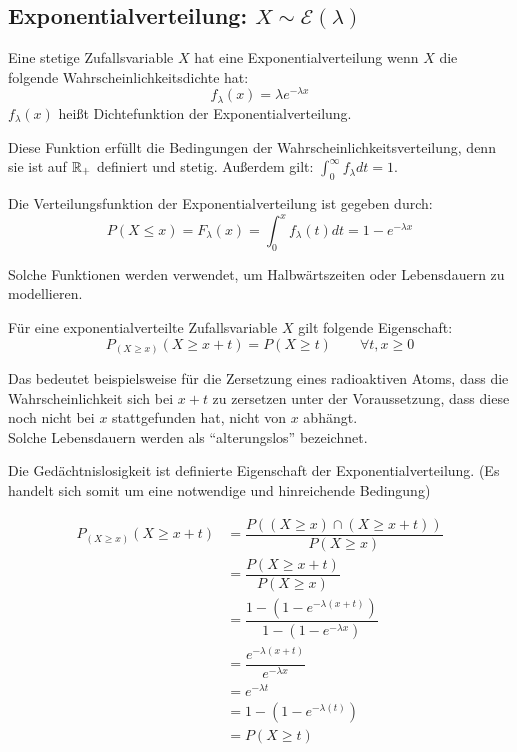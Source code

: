 \documentclass[main.tex]{subfiles}
\begin{document}
\subsection{Exponentialverteilung: $X \sim \mathcal{E}(\lambda)$}
\begin{Definition}
  Eine stetige Zufallsvariable $X$ hat eine Exponentialverteilung wenn $X$ die folgende Wahrscheinlichkeitsdichte hat:
  $$f_\lambda (x) = \lambda e^{-\lambda x}$$
  $f_\lambda(x)$ heißt Dichtefunktion der Exponentialverteilung.
\end{Definition}
\begin{Bemerkung}
  Diese Funktion erfüllt die Bedingungen der Wahrscheinlichkeitsverteilung, denn sie ist auf $\mathbb{R}_{+}$ definiert und stetig. Außerdem gilt: $\displaystyle \int_0^\infty f_\lambda dt = 1$.
\end{Bemerkung}
\begin{Definition}
  Die Verteilungsfunktion der Exponentialverteilung ist gegeben durch:
  $$P(X \leq x) = F_\lambda(x) = \int_{0}^{x} f_\lambda(t) dt = 1 - e^{-\lambda x}$$
\end{Definition}
\begin{Bemerkung}
  Solche Funktionen werden verwendet, um Halbwärtszeiten oder Lebensdauern zu modellieren.
\end{Bemerkung}
\begin{Theorem}[Gedächtnislosigkeit]
  Für eine exponentialverteilte Zufallsvariable $X$ gilt folgende Eigenschaft:
  $$P_{(X \geq x)}(X \geq x+t) = P(X \geq t)\qquad \forall t,x \geq 0$$
\end{Theorem}
\begin{Bemerkung}
  Das bedeutet beispielsweise für die Zersetzung eines radioaktiven Atoms, dass die Wahrscheinlichkeit sich bei $x+t$ zu zersetzen unter der Voraussetzung, dass diese noch nicht bei $x$ stattgefunden hat, nicht von $x$ abhängt.\\
  Solche Lebensdauern werden als ``alterungslos'' bezeichnet.
\end{Bemerkung}
\begin{Bemerkung}
  Die Gedächtnislosigkeit ist definierte Eigenschaft der Exponentialverteilung. (Es handelt sich somit um eine notwendige und hinreichende Bedingung)
\end{Bemerkung}
\begin{Beweis}
  \begin{align*}
    P_{(X \geq x)}(X \geq x+t) &= \dfrac{P((X \geq x)\cap(X \geq x+t))}{P(X \geq x)}\\
    &= \dfrac{P(X \geq x+t)}{P(X \geq x)}\\
    &= \dfrac{1-(1-e^{-\lambda(x+t)})}{1-(1-e^{-\lambda x})}\\
    &= \dfrac{e^{-\lambda(x+t)}}{e^{-\lambda x}}\\
    &= e^{-\lambda t}\\
    &= 1-(1-e^{-\lambda(t)})\\
    &= P(X \geq t)
  \end{align*}
\end{Beweis}
\end{document}
